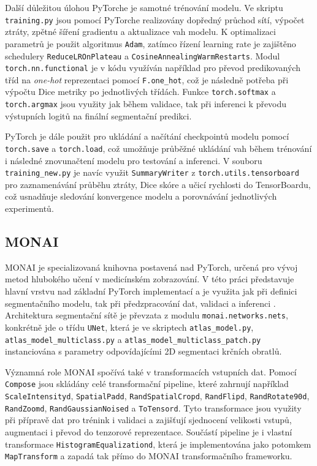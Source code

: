 \documentclass[male,czech,api_bc]{kitheses}
\begin{document}
Další důležitou úlohou PyTorche je samotné trénování modelu. Ve skriptu \texttt{training\-.py} jsou pomocí PyTorche realizovány dopředný průchod sítí, výpočet ztráty, zpětné šíření gradientu a aktualizace vah modelu. K optimalizaci parametrů je použit algoritmus \texttt{Adam}, zatímco řízení learning rate je zajištěno schedulery \texttt{ReduceLR\-OnPlateau} a \texttt{CosineAnnealing\-WarmRestarts}. Modul \texttt{torch.nn.functional} je v kódu využíván například pro převod predikovaných tříd na \textit{one-hot} reprezentaci pomocí \texttt{F.one\_hot}, což je následně potřeba při výpočtu Dice metriky po jednotlivých třídách. Funkce \texttt{torch.softmax} a \texttt{torch.argmax} jsou využity jak během validace, tak při inferenci k převodu výstupních logitů na finální segmentační predikci.

PyTorch je dále použit pro ukládání a načítání checkpointů modelu pomocí \texttt{torch\-.save} a \texttt{torch\-.load}, což umožňuje průběžné ukládání vah během trénování i následné znovunačtení modelu pro testování a inferenci. V souboru \texttt{training\_new.py} je navíc využit \texttt{SummaryWriter} z \texttt{torch.utils\-.tensorboard} pro zaznamenávání průběhu ztráty, Dice skóre a učicí rychlosti do TensorBoardu, což usnadňuje sledování konvergence modelu a porovnávání jednotlivých experimentů.

\subsection*{MONAI}
MONAI je specializovaná knihovna postavená nad PyTorch, určená pro vývoj metod hlubokého učení v medicínském zobrazování. V této práci představuje hlavní vrstvu nad základní PyTorch implementací a je využita jak při definici segmentačního modelu, tak při předzpracování dat, validaci a inferenci \cite{MONAIRepo,MONAISlidingWindowInferer}. Architektura segmentační sítě je převzata z modulu \texttt{monai.networks.nets}, konkrétně jde o třídu \texttt{UNet}, která je ve skriptech \texttt{atlas\_model.py}, \texttt{atlas\_model\-\_multiclass.py} a \texttt{atlas\_model\-\_multiclass\_patch.py} instanciována s parametry odpovídajícími 2D segmentaci krčních obratlů.

Významná role MONAI spočívá také v transformacích vstupních dat. Pomocí \texttt{\-Compose} jsou skládány celé transformační pipeline, které zahrnují například \texttt{\-Scale\-Intensityd}, \texttt{SpatialPadd}, \texttt{RandSpatialCropd}, \texttt{RandFlipd}, \texttt{RandRotate90d}, \texttt{Rand\-Zoomd}, \texttt{\-Rand\-Gaussian\-Noised} a \texttt{To\-Tensord}. Tyto transformace jsou využity při přípravě dat pro trénink i validaci a zajišťují sjednocení velikosti vstupů, augmentaci i převod do tenzorové reprezentace. Součástí pipeline je i vlastní transformace \texttt{Histogram\-Equalizationd}, která je implementována jako potomkem \texttt{MapTransform} a zapadá tak přímo do MONAI transformačního frameworku.
\end{document}
